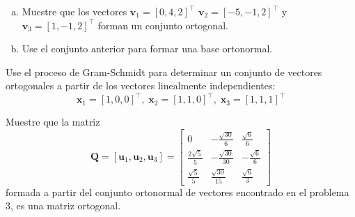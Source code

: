 \documentclass[11pt]{article}
\begin{document}
\begin{question} %
	\begin{enumerate}[a)]
		\item Muestre que los vectores $\bm{v}_1 = [0, 4, 2]^{\intercal}$ $\bm{v}_2 = [-5, -1, 2]^{\intercal}$ y $\bm{v}_3 = [1, -1, 2]^{\intercal}$ forman un conjunto ortogonal.
		\item Use el conjunto anterior para formar una base ortonormal.
	\end{enumerate}
\end{question}


\begin{question} %
	Use el proceso de Gram-Schmidt para determinar un conjunto de vectores ortogonales a partir de los vectores linealmente independientes:
	\[ \bm{x}_1 = [1, 0, 0]^{\intercal}, \; \bm{x}_2 = [1, 1, 0]^{\intercal}, \; \bm{x}_3 = [1, 1, 1]^{\intercal} \]
\end{question}

\begin{question} %
	Muestre que la matriz
	\[ \bm{Q} = [\bm{u}_1, \bm{u}_2, \bm{u}_3] =
		\begin{bmatrix} 0                    & -\frac{\sqrt{30}}{6}  & \frac{\sqrt{6}}{6}  \\[0.3em]
		                \frac{2 \sqrt{5}}{5} & -\frac{\sqrt{30}}{30} & -\frac{\sqrt{6}}{6} \\[0.3em]
		                \frac{\sqrt{5}}{5}   & \frac{\sqrt{30}}{15}  & \frac{\sqrt{6}}{3}\end{bmatrix} \]
	formada a partir del conjunto ortonormal de vectores encontrado en el problema 3, es una matriz ortogonal.
\end{question}
\end{document}
